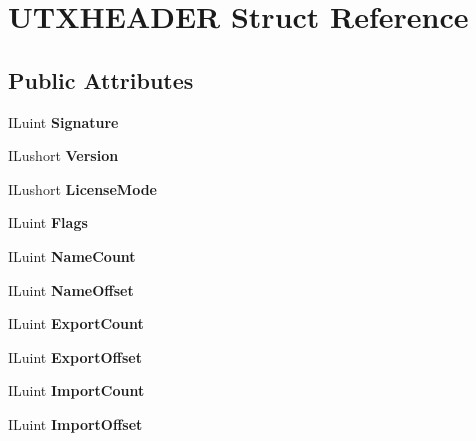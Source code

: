 \hypertarget{structUTXHEADER}{}\section{U\+T\+X\+H\+E\+A\+D\+ER Struct Reference}
\label{structUTXHEADER}
\subsection*{Public Attributes}
\begin{DoxyCompactItemize}
\item 
\mbox{\label{structUTXHEADER_ae378a2deeaad54d590f12c24f6f3532c}} 
I\+Luint {\bfseries Signature}
\item 
\mbox{\label{structUTXHEADER_ac464a68dd7c68d9aba1f42a318a7f6b1}} 
I\+Lushort {\bfseries Version}
\item 
\mbox{\label{structUTXHEADER_a94026493313330aa1a4ad734fc9e7e5c}} 
I\+Lushort {\bfseries License\+Mode}
\item 
\mbox{\label{structUTXHEADER_a9fc7cf4f0cce756624fff73a8d32b88c}} 
I\+Luint {\bfseries Flags}
\item 
\mbox{\label{structUTXHEADER_a457a269b5f96f08322bca6fd98660a19}} 
I\+Luint {\bfseries Name\+Count}
\item 
\mbox{\label{structUTXHEADER_a1a067bdfe4b7f67a27e23860febbb16c}} 
I\+Luint {\bfseries Name\+Offset}
\item 
\mbox{\label{structUTXHEADER_a9a3b53126ce6888e09ab55c78b1aebb8}} 
I\+Luint {\bfseries Export\+Count}
\item 
\mbox{\label{structUTXHEADER_a1c305d9d5939b5e583b6ee0d520f2129}} 
I\+Luint {\bfseries Export\+Offset}
\item 
\mbox{\label{structUTXHEADER_a05b31e76cdbd1396e0f2332bb5da6d61}} 
I\+Luint {\bfseries Import\+Count}
\item 
\mbox{\label{structUTXHEADER_a8a59eaec9126d914a5b4efb993aca821}} 
I\+Luint {\bfseries Import\+Offset}
\end{DoxyCompactItemize}


